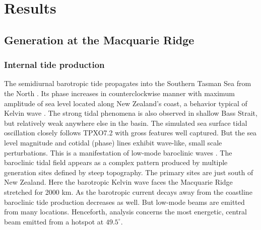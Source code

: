 \documentclass[12pt]{article}
\begin{document}
\section{Results}
\subsection{Generation at the Macquarie Ridge}
\subsubsection{Internal tide production}
The semidiurnal barotropic tide propagates into the Southern Tasman Sea from the North 
. Its phase increases in counterclockwise manner with maximum amplitude of sea 
level located along 
New Zealand's coast, a behavior typical of Kelvin wave \citep{walters2001ocean}. The 
strong tidal phenomena is also observed in shallow Bass Strait, but relatively weak anywhere else 
in the 
basin. 
The simulated sea surface tidal oscillation closely follows TPXO7.2 with gross 
features well captured. But the sea level magnitude and cotidal (phase) lines exhibit wave-like, 
small scale perturbations. This is a manifestation of low-mode baroclinic waves 
. The baroclinic tidal field appears as a complex pattern produced by multiple 
generation sites defined by steep topography. The primary sites are just south of 
New Zealand. Here the barotropic Kelvin wave faces the Macquarie Ridge stretched for 2000 km. As 
the barotropic current decays away from the coastline baroclinic tide production decreases as well. 
But low-mode beams are emitted from many locations. Henceforth, analysis concerns the 
most energetic, central beam emitted from a hotspot at $49.5^{\circ}$.\\
\end{document}
